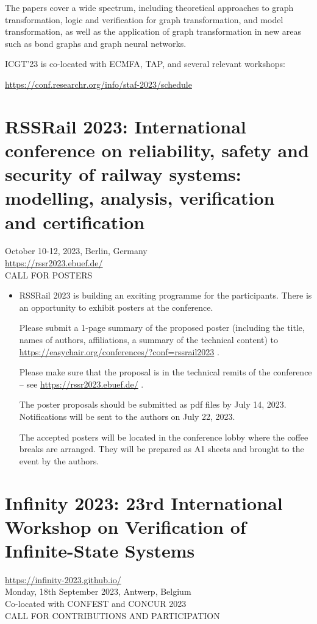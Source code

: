 \documentclass[prodmode,acmtecs]{acmsmall} %
\begin{document}
\begin{itemize}
  The papers cover a wide spectrum, including theoretical approaches to graph transformation, logic and verification for graph transformation, and model transformation, as well as the application of graph transformation in new areas such as bond graphs and graph neural networks. 
 
  ICGT'23 is co-located with ECMFA, TAP, and several relevant workshops: 
 
  \href{https://conf.researchr.org/info/staf-2023/schedule}{https://conf.researchr.org/info/staf-2023/schedule} 
 
\end{itemize}\section{RSSRail 2023: International conference on reliability, safety and security of railway systems: modelling, analysis, verification and certification}\label{RSSRail2023}  October 10-12, 2023, Berlin, Germany\\ 
  \href{https://rssr2023.ebuef.de/}{https://rssr2023.ebuef.de/}\\ 
CALL FOR POSTERS 

\begin{itemize}\item   RSSRail 2023 is building an exciting programme for the participants. There is an opportunity to exhibit posters at the conference.   
 
  Please submit a 1-page summary of the proposed poster (including the title, names of authors, affiliations, a summary of the technical content) to \href{https://easychair.org/conferences/?conf=rssrail2023}{https://easychair.org/conferences/?conf=rssrail2023} . 
 
  Please make sure that the proposal is in the technical remits of the conference – see  \href{https://rssr2023.ebuef.de/}{https://rssr2023.ebuef.de/} . 
 
  The poster proposals should be submitted as pdf files by July 14, 2023. Notifications will be sent to the authors on July 22, 2023.  
 
  The accepted posters will be located in the conference lobby where the coffee breaks are arranged. They will be prepared as A1 sheets and brought to the event by the authors.  
 
\end{itemize}\section{Infinity 2023: 23rd International Workshop on Verification of Infinite-State Systems}\label{Infinity2023}  \href{https://infinity-2023.github.io/}{https://infinity-2023.github.io/}\\ 
  Monday, 18th September 2023, Antwerp, Belgium\\ 
  Co-located with CONFEST and CONCUR 2023\\ 
CALL FOR CONTRIBUTIONS AND PARTICIPATION 
\end{document}
